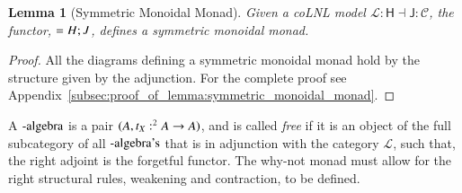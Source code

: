 \documentclass{lmcs}
\newtheorem{lemma}[theorem]{Lemma}
\let\mto\to
\let\to\relax
\newcommand{\to}{\rightarrow}
\let\wn\relax
\newcommand{\cat}[1]{\mathcal{#1}}
\newcommand{\func}[1]{\mathsf{#1}}
\newcommand{\wn}[0]{\mathop{?}}
\begin{document}
\begin{lemma}[Symmetric Monoidal Monad]
  \label{lemma:symmetric_monoidal_monad}
  Given a coLNL model $\cat{L} : \func{H} \dashv \func{J} : \cat{C}$,
  the functor, $\wn = H;J$, defines a symmetric monoidal monad.
\end{lemma}
\begin{proof}
  All the diagrams defining a symmetric monoidal monad hold by the
  structure given by the adjunction.  For the complete proof see
  Appendix~\ref{subsec:proof_of_lemma:symmetric_monoidal_monad}.
\end{proof}

A $\wn\text{-algebra}$ is a pair $(\wn A, t_X : \wn^2 A \mto \wn A)$,
and is called \textit{free} if it is an object of the full subcategory
of all $\wn\text{-algebra's}$ that is in adjunction with the category
$\cat{L}$, such that, the right adjoint is the forgetful functor.  The
why-not monad must allow for the right structural rules, weakening and
contraction, to be defined.
\end{document}
